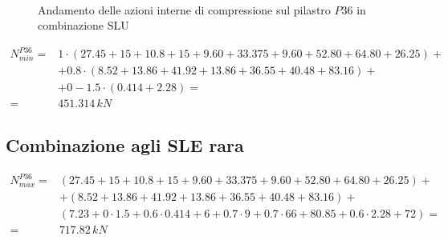 \begin{figure}
	\centering
	\\
	\caption{Andamento delle azioni interne di compressione sul pilastro $P36$ in combinazione SLU}
	\label{fig:P36axialLoad_slu}
\end{figure}

\begin{align*}
	N_{min}^{P36} =& 1\cdot(27.45 + 15 +10.8 + 15+9.60 + 33.375+9.60+52.80+64.80+26.25)+\\
	&+0.8\cdot(8.52+13.86+41.92+13.86+36.55+40.48+83.16)+\\
	&+0 - 1.5\cdot(0.414 + 2.28) =\\
	=& 451.314\,kN
\end{align*}

\subsection{Combinazione agli SLE rara}

\begin{align*}
	N_{max}^{P36} =&(27.45 + 15 +10.8 + 15+9.60 + 33.375+9.60+52.80+64.80+26.25)+\\
	&+(8.52+13.86+41.92+13.86+36.55+40.48+83.16)+\\
	&(7.23+0\cdot1.5+0.6\cdot0.414+6+0.7\cdot9+0.7\cdot66+80.85+0.6\cdot2.28+72) =\\
	=& 717.82\,kN
\end{align*}

